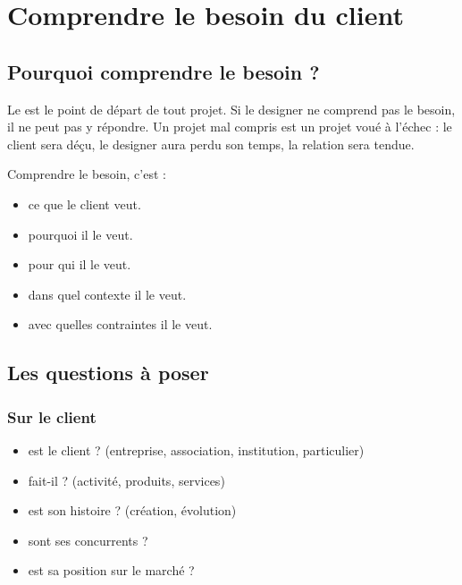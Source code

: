 \section{Comprendre le besoin du client}

\subsection{Pourquoi comprendre le besoin ?}

Le  est le point de départ de tout projet. Si le designer ne comprend pas le besoin, il ne peut pas y répondre. Un projet mal compris est un projet voué à l'échec : le client sera déçu, le designer aura perdu son temps, la relation sera tendue.

Comprendre le besoin, c'est :

\begin{itemize}
    \item {} ce que le client veut.
    \item {} pourquoi il le veut.
    \item {} pour qui il le veut.
    \item {} dans quel contexte il le veut.
    \item {} avec quelles contraintes il le veut.
\end{itemize}

\subsection{Les questions à poser}

\subsubsection{Sur le client}

\begin{itemize}
    \item {} est le client ? (entreprise, association, institution, particulier)
    \item {} fait-il ? (activité, produits, services)
    \item {} est son histoire ? (création, évolution)
    \item {} sont ses concurrents ?
    \item {} est sa position sur le marché ?
\end{itemize}

